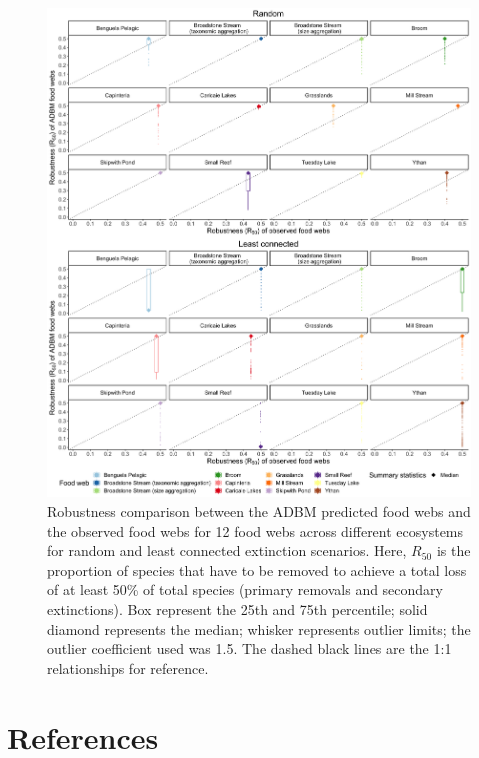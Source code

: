 \documentclass{article}
\begin{document}
\begin{figure}[H]

{\centering \includegraphics[width=450px]{../results/plot_R50_ADBM_vs_obs_ra_lc_facet} 

}

\caption{\label{fig:fig_a2} Robustness comparison between the ADBM predicted food webs and the observed food webs for 12 food webs across different ecosystems for random and least connected extinction scenarios. Here, $R_{50}$ is the proportion of species that have to be removed to achieve a total loss of at least 50\% of total species (primary removals and secondary extinctions). Box represent the 25th and 75th percentile; solid diamond represents the median; whisker represents outlier limits; the outlier coefficient used was 1.5. The dashed black lines are the 1:1 relationships for reference.}\label{fig:unnamed-chunk-5}
\end{figure}

\hypertarget{references}{%
\section*{References}\label{references}}
\end{document}

